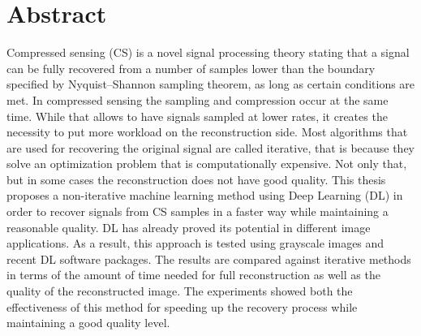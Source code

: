 

\cleardoublepage
\chapter*{Abstract}
Compressed sensing (CS) is a novel signal processing theory stating that a signal can be fully recovered from a number of samples lower than the boundary specified by Nyquist–Shannon sampling theorem, as long as certain conditions are met. In compressed sensing the sampling and compression occur at the same time. While that allows to have signals sampled at lower rates, it creates the necessity to put more workload on the reconstruction side. Most algorithms that are used for recovering the original signal are called iterative, that is because they solve an optimization problem that is computationally expensive. Not only that, but in some cases the reconstruction does not have good quality. This thesis proposes a non-iterative machine learning method using Deep Learning (DL) in order to recover signals from CS samples in a faster way while maintaining a reasonable quality. DL has already proved its potential in different image applications. As a result, this approach is tested using grayscale images and recent DL software packages. The results are compared against iterative methods in terms of the amount of time needed for full reconstruction as well as the quality of the reconstructed image. The experiments showed both the effectiveness of this method for speeding up the recovery process while maintaining a good quality level.  
\vskip0.5cm









